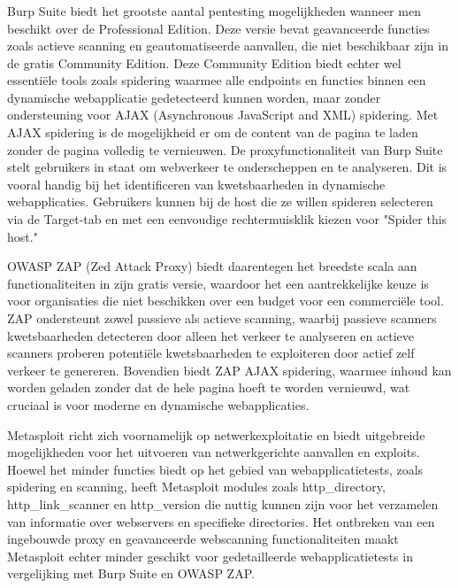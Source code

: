 \subsubsection{}
Burp Suite biedt het grootste aantal pentesting mogelijkheden wanneer men beschikt over de Professional Edition. Deze 
versie bevat geavanceerde functies zoals actieve scanning en geautomatiseerde aanvallen, die niet beschikbaar zijn in de 
gratis Community Edition. Deze Community Edition biedt echter wel essentiële tools zoals spidering waarmee alle endpoints 
en functies binnen een dynamische webapplicatie gedetecteerd kunnen worden, maar zonder ondersteuning 
voor AJAX (Asynchronous JavaScript and XML) spidering. Met AJAX spidering is de mogelijkheid er om de content van de pagina 
te laden zonder de pagina volledig te vernieuwen. De proxyfunctionaliteit van Burp Suite stelt gebruikers in staat om webverkeer te onderscheppen en te 
analyseren. Dit is vooral handig bij het identificeren van kwetsbaarheden in dynamische webapplicaties. Gebruikers kunnen bij de 
host die ze willen spideren selecteren via de Target-tab en met een eenvoudige rechtermuisklik kiezen voor "Spider this host."

OWASP ZAP (Zed Attack Proxy) biedt daarentegen het breedste scala aan functionaliteiten in zijn gratis versie, waardoor het 
een aantrekkelijke keuze is voor organisaties die niet beschikken over een budget voor een commerciële tool. ZAP ondersteunt zowel 
passieve als actieve scanning, waarbij passieve scanners kwetsbaarheden detecteren door alleen het verkeer te analyseren en 
actieve scanners proberen potentiële kwetsbaarheden te exploiteren door actief zelf verkeer te genereren. Bovendien biedt ZAP AJAX 
spidering, waarmee inhoud kan worden geladen zonder dat de hele pagina hoeft te worden vernieuwd, wat cruciaal is voor 
moderne en dynamische webapplicaties.

Metasploit richt zich voornamelijk op netwerkexploitatie en biedt uitgebreide mogelijkheden voor het uitvoeren van netwerkgerichte 
aanvallen en exploits. Hoewel het minder functies biedt op het gebied van webapplicatietests, zoals spidering en scanning, 
heeft Metasploit modules zoals http\_directory, http\_link\_scanner en http\_version die nuttig kunnen zijn voor het verzamelen 
van informatie over webservers en specifieke directories. Het ontbreken van een ingebouwde proxy en geavanceerde 
webscanning functionaliteiten maakt Metasploit echter minder geschikt voor gedetailleerde webapplicatietests in vergelijking 
met Burp Suite en OWASP ZAP.

